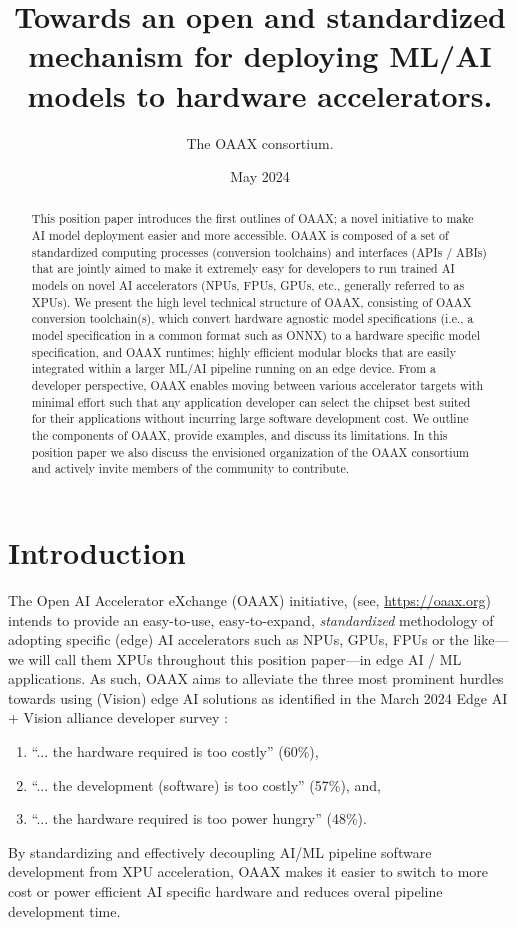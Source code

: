 \documentclass{article}
\newcommand{\oaaxweb}{\href{https://oaax.org}{https://oaax.org}}
\begin{document}
\title{Towards an open and standardized mechanism for deploying ML/AI models to hardware accelerators.}
\author{The OAAX consortium.}
\date{May 2024}
\maketitle

\begin{abstract}
This position paper introduces the first outlines of OAAX; a novel initiative to make AI model deployment easier and more accessible. OAAX is composed of a set of standardized computing processes (conversion toolchains) and interfaces (APIs / ABIs) that are jointly aimed to make it extremely easy for developers to run trained AI models on novel AI accelerators  (NPUs, FPUs, GPUs, etc., generally referred to as XPUs). We present the high level technical structure of OAAX, consisting of OAAX conversion toolchain(s), which convert hardware agnostic model specifications (i.e., a model specification in a common format such as ONNX) to a hardware specific model specification, and OAAX runtimes; highly efficient modular blocks that are easily integrated within a larger ML/AI pipeline running on an edge device. From a developer perspective, OAAX enables moving between various accelerator targets with minimal effort such that any application developer can select the chipset best suited for their applications without incurring large software development cost. We outline the components of OAAX, provide examples, and discuss its limitations. In this position paper we also discuss the envisioned organization of the OAAX consortium and actively invite members of the community to contribute.
\end{abstract}

\tableofcontents

\section{Introduction}

The Open AI Accelerator eXchange (OAAX) initiative,  (see, \oaaxweb) intends to provide an easy-to-use, easy-to-expand, \emph{standardized} methodology of adopting specific (edge) AI accelerators such as NPUs, GPUs, FPUs or the like---we will call them XPUs throughout this position paper---in edge AI / ML applications. As such, OAAX aims to alleviate the three most prominent hurdles towards using (Vision) edge AI solutions as identified in the March 2024 Edge AI + Vision alliance developer survey \cite{EVS}:
\begin{enumerate}
\item ``... the hardware required is too costly'' (60\%),
\item ``... the development (software) is too costly'' (57\%), and,
\item ``... the hardware required is too power hungry'' (48\%).
\end{enumerate}
By standardizing and effectively decoupling AI/ML pipeline software development from XPU acceleration, OAAX makes it easier to switch to more cost or power efficient AI specific hardware and reduces overal pipeline development time.
\end{document}
